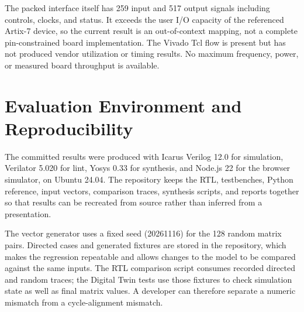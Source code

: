 \documentclass[conference]{IEEEtran}
\begin{document}
The packed interface itself has 259 input and 517 output signals including controls, clocks, and status. It exceeds the
user I/O capacity of the referenced Artix-7 device, so the current result is an out-of-context mapping, not a complete
pin-constrained board implementation. The Vivado Tcl flow is present but has not produced vendor utilization or timing
results. No maximum frequency, power, or measured board throughput is available.

\section{Evaluation Environment and Reproducibility}
The committed results were produced with Icarus Verilog 12.0 for simulation, Verilator 5.020 for lint, Yosys 0.33
for synthesis, and Node.js 22 for the browser simulator, on Ubuntu 24.04. The repository keeps the RTL, testbenches,
Python reference, input vectors, comparison traces, synthesis scripts, and reports together so that results can be
recreated from source rather than inferred from a presentation.

\begin{table}[t]\centering\small
\caption{Reproduction commands and principal outputs.}\label{tab:repro}
\end{table}

The vector generator uses a fixed seed (20261116) for the 128 random matrix pairs. Directed cases and generated
fixtures are stored in the repository, which makes the regression repeatable and allows changes to the model to be
compared against the same inputs. The RTL comparison script consumes recorded directed and random traces; the Digital
Twin tests use those fixtures to check simulation state as well as final matrix values. A developer can therefore
separate a numeric mismatch from a cycle-alignment mismatch.
\end{document}
